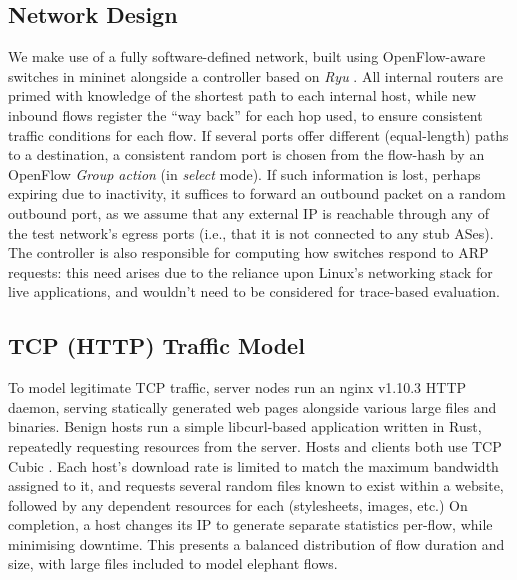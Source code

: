 \documentclass[10pt, times, comsoc]{IEEEtran}
\begin{document}
\subsection{Network Design}
We make use of a fully software-defined network, built using OpenFlow-aware switches in mininet alongside a controller based on \emph{Ryu} \cite{ryu}.
All internal routers are primed with knowledge of the shortest path to each internal host, while new inbound flows register the ``way back'' for each hop used, to ensure consistent traffic conditions for each flow.
If several ports offer different (equal-length) paths to a destination, a consistent random port is chosen from the flow-hash by an OpenFlow \emph{Group action} (in \emph{select} mode).
If such information is lost, perhaps expiring due to inactivity, it suffices to forward an outbound packet on a random outbound port, as we assume that any external IP is reachable through any of the test network's egress ports (i.e., that it is not connected to any stub ASes).
The controller is also responsible for computing how switches respond to ARP requests: this need arises due to the reliance upon Linux's networking stack for live applications, and wouldn't need to be considered for trace-based evaluation.

\subsection{TCP (HTTP) Traffic Model}\label{sec:tcp-http-traffic-model}
To model legitimate TCP traffic, server nodes run an nginx v1.10.3 HTTP daemon, serving statically generated web pages alongside various large files and binaries.
Benign hosts run a simple libcurl-based application written in Rust, repeatedly requesting resources from the server.
Hosts and clients both use TCP Cubic \cite{rfc8312}.
Each host's download rate is limited to match the maximum bandwidth assigned to it, and requests several random files known to exist within a website, followed by any dependent resources for each (stylesheets, images, etc.) 
On completion, a host changes its IP to generate separate statistics per-flow, while minimising downtime.
This presents a balanced distribution of flow duration and size, with large files included to model elephant flows.
\end{document}
